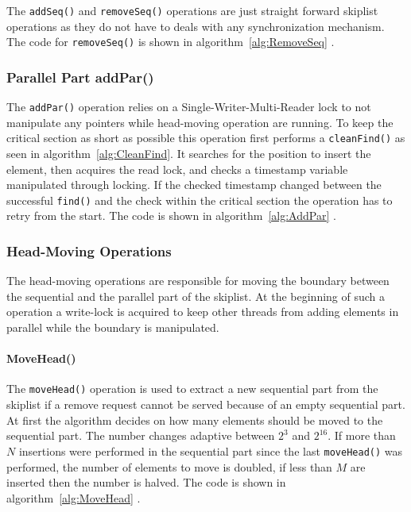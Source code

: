 The \texttt{addSeq()} and \texttt{removeSeq()} operations are just straight forward skiplist operations as they do not have to deals with any synchronization mechanism. The code for \texttt{removeSeq()} is shown in algorithm~\ref{alg:RemoveSeq} \cite{calciu_adaptive_2014}.

\subsubsection{Parallel Part addPar()}

The \texttt{addPar()} operation relies on a Single-Writer-Multi-Reader lock to not manipulate any pointers while head-moving operation are running. To keep the critical section as short as possible this operation first performs a \texttt{cleanFind()} as seen in algorithm~\ref{alg:CleanFind}. It searches for the position to insert the element, then acquires the read lock, and checks a timestamp variable manipulated through locking. If the checked timestamp changed between the successful \texttt{find()} and the check within the critical section the operation has to retry from the start. The code is shown in algorithm~\ref{alg:AddPar} \cite{calciu_adaptive_2014}.

\subsubsection{Head-Moving Operations}

The head-moving operations are responsible for moving the boundary between the sequential and the parallel part of the skiplist. At the beginning of such a operation a write-lock is acquired to keep other threads from adding elements in parallel while the boundary is manipulated.

\paragraph{MoveHead()}

The \texttt{moveHead()} operation is used to extract a new sequential part from the skiplist if a remove request cannot be served because of an empty sequential part. At first the algorithm decides on how many elements should be moved to the sequential part. The number changes adaptive between $2^3$ and $2^{16}$. If more than $N$ insertions were performed in the sequential part since the last \texttt{moveHead()} was performed, the number of elements to move is doubled, if less than $M$ are inserted then the number is halved. The code is shown in algorithm~\ref{alg:MoveHead} \cite{calciu_adaptive_2014}.

